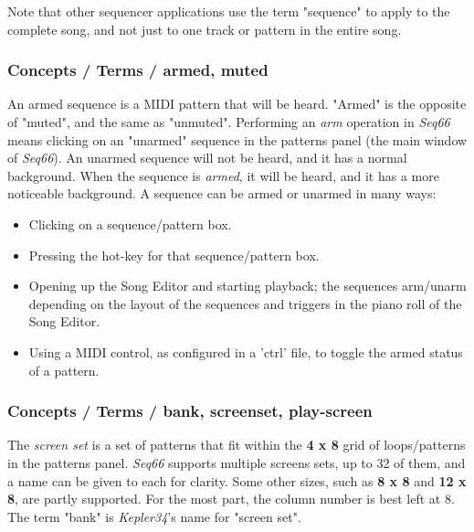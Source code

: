    Note that other sequencer applications use the term "sequence"
   to apply to the complete song, and not just to one track or pattern in the
   entire song.

\subsubsection{Concepts / Terms / armed, muted}
\label{subsubsec:concepts_terms_armed}

   An armed sequence is a MIDI pattern that will be heard.
   "Armed" is the opposite of "muted", and the same as "unmuted".
   Performing an \textsl{arm} operation in \textsl{Seq66}
   means clicking on an "unarmed" sequence in the patterns panel (the main
   window of \textsl{Seq66}).
   An unarmed sequence will not be heard, and it has a normal background.
   When the sequence is \textsl{armed}, it will be heard, and it has a
   more noticeable  background.
   A sequence can be armed or unarmed in many ways:

   \begin{itemize}
      \item Clicking on a sequence/pattern box.
      \item Pressing the hot-key for that sequence/pattern box.
      \item Opening up the Song Editor and starting playback; the
         sequences arm/unarm depending on the layout of the
         sequences and triggers in the piano roll of the Song Editor.
      \item Using a MIDI control, as configured in a 'ctrl' file, to
         toggle the armed status of a pattern.
   \end{itemize}

\subsubsection{Concepts / Terms / bank, screenset, play-screen}
\label{subsubsec:concepts_terms_bank}

   The \textsl{screen set}
   is a set of patterns that fit within the \textbf{4 x 8}
   grid of loops/patterns in the patterns panel.
   \textsl{Seq66} supports multiple screens sets, up to 32 of them,
   and a name can be given to each for clarity.
   Some other sizes, such as \textbf{8 x 8} and \textbf{12 x 8}, are
   partly supported.  For the most part, the column number is best left at 8.
   The term "bank" is \textsl{Kepler34}'s name for "screen set".

